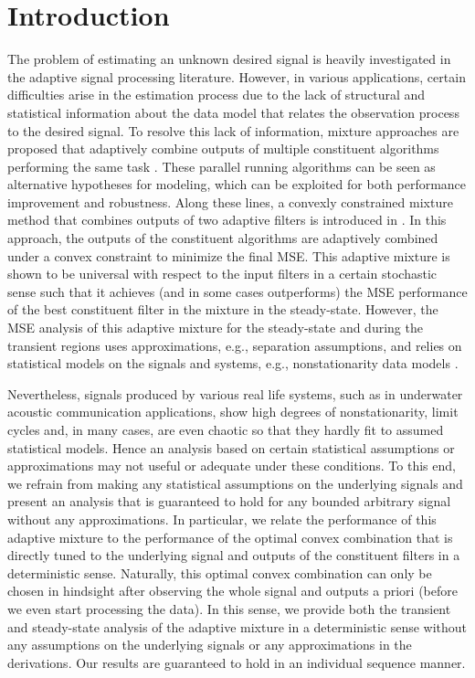 \documentclass[journal]{IEEEtran}
\begin{document}
\section{Introduction}
\label{sec:introduction}
The problem of estimating an unknown desired signal is heavily
investigated in the adaptive signal processing literature. However, in
various applications, certain difficulties arise in the estimation
process due to the lack of structural and statistical information
about the data model that relates the observation process to the
desired signal. To resolve this lack of information, mixture
approaches are proposed that adaptively combine outputs of multiple
constituent algorithms performing the same task \cite{sinfed,
  convex,tranconv}. These parallel running algorithms can be seen as
alternative hypotheses for modeling, which can be exploited for both
performance improvement and robustness. Along these lines, a convexly
constrained mixture method that combines outputs of two adaptive
filters is introduced in \cite{convex}. In this approach, the outputs
of the constituent algorithms are adaptively combined under a convex
constraint to minimize the final MSE. This adaptive mixture is shown
to be universal with respect to the input filters in a certain
stochastic sense such that it achieves (and in some cases outperforms)
the MSE performance of the best constituent filter in the mixture in
the steady-state. However, the MSE analysis of this adaptive mixture
for the steady-state and during the transient regions uses
approximations, e.g., separation assumptions, and relies on
statistical models on the signals and systems, e.g., nonstationarity
data models \cite{convex,tranconv,kozat}.

Nevertheless, signals produced by various real life systems, such as
in underwater acoustic communication applications, show high degrees
of nonstationarity, limit cycles and, in many cases, are even chaotic
so that they hardly fit to assumed statistical models. Hence an analysis
based on certain statistical assumptions or approximations may not
useful or adequate under these conditions. To this end, we refrain
from making any statistical assumptions on the underlying signals and
present an analysis that is guaranteed to hold for any bounded
arbitrary signal without any approximations. In particular, we relate
the performance of this adaptive mixture to the performance of the
optimal convex combination that is directly tuned to the underlying
signal and outputs of the constituent filters in a deterministic
sense. Naturally, this optimal convex combination can only be
chosen in hindsight after observing the whole signal and outputs a
priori (before we even start processing the data).  In this sense, we
provide both the transient and steady-state analysis of the adaptive
mixture in a deterministic sense without any assumptions on the
underlying signals or any approximations in the derivations.  Our
results are guaranteed to hold in an individual sequence manner.
\end{document}
